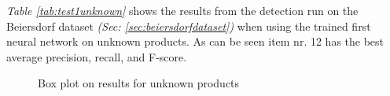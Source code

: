 \textit{Table \ref{tab:test1unknown}} shows the results from the detection run on the Beiersdorf dataset \textit{(Sec: \ref{sec:beiersdorfdataset})} when using the trained first neural network on unknown products. As can be seen item nr. 12 has the best average precision, recall, and F-score.

\clearpage

\begin{figure}[h]
    \centering
    \hfill
    
    \caption{Box plot on results for unknown products}
    \label{fig:unknowniou}
\end{figure}

